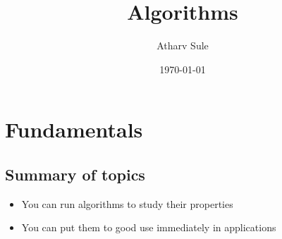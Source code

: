 \documentclass[11pt]{report}
\author{Atharv Sule}
\date{\today}
\title{Algorithms}
\begin{document}
\maketitle
\tableofcontents


\part{Fundamentals}
\label{sec:org065b46b}
\chapter{Summary of topics}
\label{sec:org4a2cab5}
\begin{itemize}
\item You can run algorithms to study their properties
\item You can put them to good use immediately in applications
\end{itemize}
\end{document}
